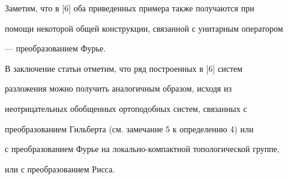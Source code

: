 Заметим, что в [6] оба приведенных примера также получаются при


помощи некоторой общей конструкции, связанной с унитарным оператором


--- преобразованием Фурье.





В заключение статьи отметим, что ряд построенных в [6] систем


разложения можно получить аналогичным образом, исходя из


неотрицательных обобщенных ортоподобных систем, связанных с


преобразованием Гильберта (см. замечание 5 к определению 4) или


с преобразованием Фурье на локально-компактной топологической группе,


или с преобразованием Рисса.





